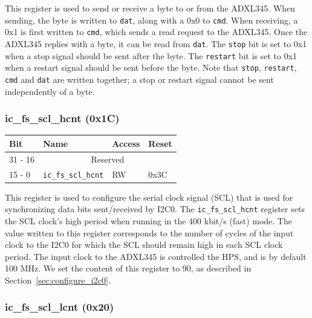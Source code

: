 \documentclass[11pt, twoside, pdftex]{article}
\begin{document}
This register is used to send or receive a byte to or from the ADXL345. When sending, the byte is written to \texttt{dat}, along with a 0x0 to \texttt{cmd}. When receiving, a 0x1 is first written to \texttt{cmd}, which sends a read request to the ADXL345. Once the ADXL345 replies with a byte, it can be read from \texttt{dat}. The \texttt{stop} bit is set to 0x1 when a stop signal should be sent after the byte. The \texttt{restart} bit is set to 0x1 when a restart signal should be sent before the byte. Note that \texttt{stop}, \texttt{restart}, \texttt{cmd} and \texttt{dat} are written together; a stop or restart signal cannot be sent independently of a byte.

\pagebreak

\subsubsection{ic\_fs\_scl\_hcnt (0x1C)}

\begin{table}[H]
    \centering
    \begin{tabular}{|l|l|l|l|}
        \hline
            \textbf{Bit}
            & \textbf{Name}
            & \textbf{Access}
            & \textbf{Reset}
        \\\hline
            31 - 16
            & \multicolumn{3}{|c|}{Reserved}
        \\\hline
            15 - 0
            & \texttt{ic\_fs\_scl\_hcnt}
            & RW
            & 0x3C
        \\\hline
    \end{tabular}
\end{table}

This register is used to configure the serial clock signal (SCL) that is used for synchronizing data bits sent/received by I2C0. The \texttt{ic\_fs\_scl\_hcnt} register sets the SCL clock's high period when running in the 400 kbit/s (fast) mode. The value written to this register corresponds to the number of cycles of the input clock to the I2C0 for which the SCL should remain high in each SCL clock period. The input clock to the ADXL345 is controlled the HPS, and is by default 100 MHz. We set the content of this register to 90, as described in Section~\ref{sec:configure_i2c0}.

\subsubsection{ic\_fs\_scl\_lcnt (0x20)}
\end{document}
